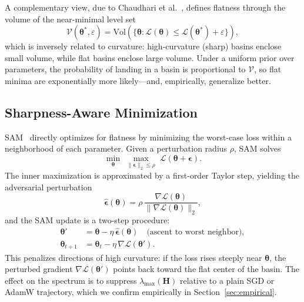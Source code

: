 \documentclass[twocolumn,10pt]{article}
\newcommand{\Hmat}{\mathbf{H}}
\newcommand{\grad}{\nabla}
\begin{document}
A complementary view, due to Chaudhari et al.~\cite{chaudhari2019entropy}, defines flatness through the volume of the near-minimal level set
\begin{equation}
\mathcal{V}(\boldsymbol{\theta}^\ast, \varepsilon) = \mathrm{Vol}\!\left(\{\boldsymbol{\theta} : \mathcal{L}(\boldsymbol{\theta}) \leq \mathcal{L}(\boldsymbol{\theta}^\ast) + \varepsilon\}\right),
\label{eq:volume}
\end{equation}
which is inversely related to curvature: high-curvature (sharp) basins enclose small volume, while flat basins enclose large volume. Under a uniform prior over parameters, the probability of landing in a basin is proportional to $\mathcal{V}$, so flat minima are exponentially more likely---and, empirically, generalize better.

\subsection{Sharpness-Aware Minimization}

SAM~\cite{foret2021sharpness} directly optimizes for flatness by minimizing the worst-case loss within a neighborhood of each parameter. Given a perturbation radius $\rho$, SAM solves
\begin{equation}
\min_{\boldsymbol{\theta}} \; \max_{\|\boldsymbol{\epsilon}\|_2 \leq \rho} \; \mathcal{L}(\boldsymbol{\theta} + \boldsymbol{\epsilon}).
\label{eq:sam}
\end{equation}
The inner maximization is approximated by a first-order Taylor step, yielding the adversarial perturbation
\begin{equation}
\hat{\boldsymbol{\epsilon}}(\boldsymbol{\theta}) = \rho\, \frac{\grad \mathcal{L}(\boldsymbol{\theta})}{\|\grad \mathcal{L}(\boldsymbol{\theta})\|_2},
\label{eq:sam-epsilon}
\end{equation}
and the SAM update is a two-step procedure:
\begin{align}
\boldsymbol{\theta}' &= \boldsymbol{\theta} - \eta\, \hat{\boldsymbol{\epsilon}}(\boldsymbol{\theta}) \quad \text{(ascent to worst neighbor)}, \\
\boldsymbol{\theta}_{t+1} &= \boldsymbol{\theta}_t - \eta\, \grad \mathcal{L}(\boldsymbol{\theta}').
\end{align}
This penalizes directions of high curvature: if the loss rises steeply near $\boldsymbol{\theta}$, the perturbed gradient $\grad \mathcal{L}(\boldsymbol{\theta}')$ points back toward the flat center of the basin. The effect on the spectrum is to suppress $\lambda_{\max}(\Hmat)$ relative to a plain SGD or AdamW trajectory, which we confirm empirically in Section~\ref{sec:empirical}.
\end{document}
